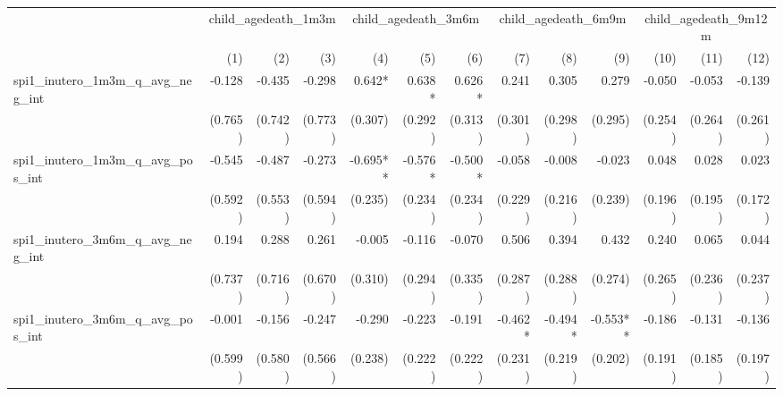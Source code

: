 \begin{tabular}{lrrrrrrrrrrrr}
\toprule
                                            &  \multicolumn{3}{c}{child\_agedeath\_1m3m} &  \multicolumn{3}{c}{child\_agedeath\_3m6m} &  \multicolumn{3}{c}{child\_agedeath\_6m9m} & \multicolumn{3}{c}{child\_agedeath\_9m12m} \\ 
\cmidrule(lr){2-4} \cmidrule(lr){5-7} \cmidrule(lr){8-10} \cmidrule(lr){11-13} 
                                            &          (1) &          (2) &          (3) &          (4) &          (5) &          (6) &          (7) &          (8) &          (9) &         (10) &         (11) &         (12) \\ 
\midrule
spi1\_inutero\_1m3m\_q\_avg\_neg\_int       &       -0.128 &       -0.435 &       -0.298 &       0.642* &       0.638* &       0.626* &        0.241 &        0.305 &        0.279 &       -0.050 &       -0.053 &       -0.139 \\ 
                                            &      (0.765) &      (0.742) &      (0.773) &      (0.307) &      (0.292) &      (0.313) &      (0.301) &      (0.298) &      (0.295) &      (0.254) &      (0.264) &      (0.261) \\ 
spi1\_inutero\_1m3m\_q\_avg\_pos\_int       &       -0.545 &       -0.487 &       -0.273 &     -0.695** &      -0.576* &      -0.500* &       -0.058 &       -0.008 &       -0.023 &        0.048 &        0.028 &        0.023 \\ 
                                            &      (0.592) &      (0.553) &      (0.594) &      (0.235) &      (0.234) &      (0.234) &      (0.229) &      (0.216) &      (0.239) &      (0.196) &      (0.195) &      (0.172) \\ 
spi1\_inutero\_3m6m\_q\_avg\_neg\_int       &        0.194 &        0.288 &        0.261 &       -0.005 &       -0.116 &       -0.070 &        0.506 &        0.394 &        0.432 &        0.240 &        0.065 &        0.044 \\ 
                                            &      (0.737) &      (0.716) &      (0.670) &      (0.310) &      (0.294) &      (0.335) &      (0.287) &      (0.288) &      (0.274) &      (0.265) &      (0.236) &      (0.237) \\ 
spi1\_inutero\_3m6m\_q\_avg\_pos\_int       &       -0.001 &       -0.156 &       -0.247 &       -0.290 &       -0.223 &       -0.191 &      -0.462* &      -0.494* &     -0.553** &       -0.186 &       -0.131 &       -0.136 \\ 
                                            &      (0.599) &      (0.580) &      (0.566) &      (0.238) &      (0.222) &      (0.222) &      (0.231) &      (0.219) &      (0.202) &      (0.191) &      (0.185) &      (0.197) \\ 

\end{tabular}
